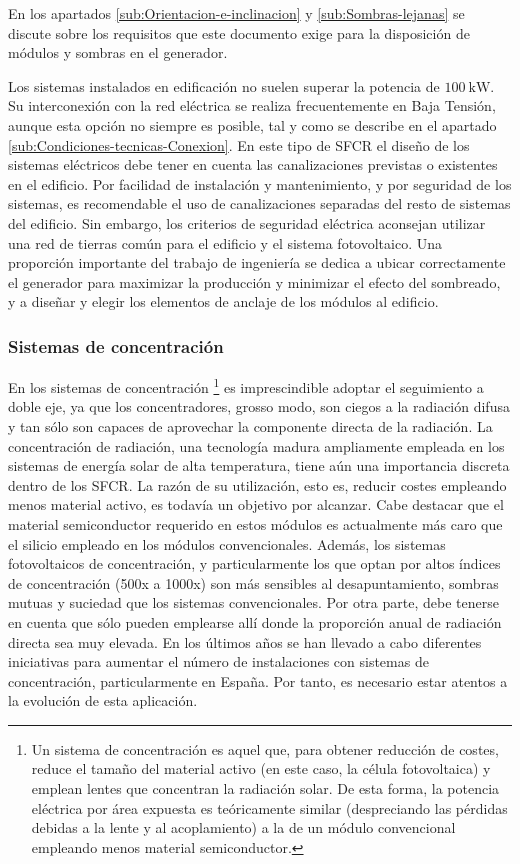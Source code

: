 En los apartados \ref{sub:Orientacion-e-inclinacion} y
\ref{sub:Sombras-lejanas} se discute sobre los requisitos que
este documento exige para la disposición de módulos y sombras en el
generador.

Los sistemas instalados en edificación no suelen superar la potencia
de $\SI{100}{\kilo\watt}$. Su interconexión con la red eléctrica
se realiza frecuentemente en Baja Tensión, aunque esta opción no siempre
es posible, tal y como se describe en el apartado \ref{sub:Condiciones-tecnicas-Conexion}.
En este tipo de SFCR el diseño de los sistemas eléctricos debe tener
en cuenta las canalizaciones previstas o existentes en el edificio.
Por facilidad de instalación y mantenimiento, y por seguridad de los
sistemas, es recomendable el uso de canalizaciones separadas del resto
de sistemas del edificio. Sin embargo, los criterios de seguridad
eléctrica aconsejan utilizar una red de tierras común para el edificio
y el sistema fotovoltaico. Una proporción importante del trabajo de
ingeniería se dedica a ubicar correctamente el generador para maximizar
la producción y minimizar el efecto del sombreado, y a diseñar y elegir
los elementos de anclaje de los módulos al edificio.


\subsubsection{Sistemas de concentración}

En los sistemas de concentración%
\footnote{Un sistema de concentración es aquel que, para obtener reducción de
costes, reduce el tamaño del material activo (en este caso, la célula
fotovoltaica) y emplean lentes que concentran la radiación solar.
De esta forma, la potencia eléctrica por área expuesta es teóricamente
similar (despreciando las pérdidas debidas a la lente y al acoplamiento)
a la de un módulo convencional empleando menos material semiconductor.%
} es imprescindible adoptar el seguimiento a doble eje, ya que los
concentradores, grosso modo, son ciegos a la radiación difusa y tan
sólo son capaces de aprovechar la componente directa de la radiación.
La concentración de radiación, una tecnología madura ampliamente empleada
en los sistemas de energía solar de alta temperatura, tiene aún una
importancia discreta dentro de los SFCR. La razón de su utilización,
esto es, reducir costes empleando menos material activo, es todavía
un objetivo por alcanzar. Cabe destacar que el material semiconductor
requerido en estos módulos es actualmente más caro que el silicio
empleado en los módulos convencionales. Además, los sistemas fotovoltaicos
de concentración, y particularmente los que optan por altos índices
de concentración (500x a 1000x) son más sensibles al desapuntamiento,
sombras mutuas y suciedad que los sistemas convencionales. Por otra
parte, debe tenerse en cuenta que sólo pueden emplearse allí donde
la proporción anual de radiación directa sea muy elevada. En los últimos
años se han llevado a cabo diferentes iniciativas para aumentar el
número de instalaciones con sistemas de concentración, particularmente
en España. Por tanto, es necesario estar atentos a la evolución de
esta aplicación.




